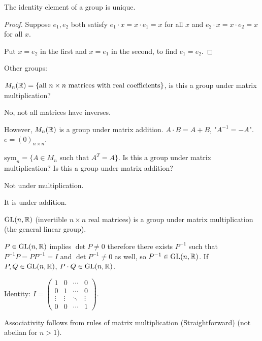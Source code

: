 \documentclass[10pt, a4paper]{article}
\begin{document}
\begin{proposition}
    The identity element of a group is unique.

    \begin{proof}
        Suppose $e_1, e_2$ both satisfy $e_1 \cdot x = x \cdot e_1 = x$ for all $x$ and $e_2 \cdot x = x \cdot e_2 = x$ for all $x$.

        Put $x = e_2$ in the first and $x = e_1$ in the second,
        to find $e_1 = e_2$.
    \end{proof}
\end{proposition}

Other groups:
\begin{example}
    $M_n(\mathbb{R}) = \{\text{all $n \times n$ matrices with real coefficients}\}$,
    is this a group under matrix multiplication?

    \begin{solution}
        No,
        not all matrices have inverses.

        However,
        $M_n(\mathbb{R})$ is a group under matrix addition.
        $A \cdot B = A + B$,
        "$A ^ {-1} = -A$".
        $e = (0)_{n \times n}$.
    \end{solution}
\end{example}

\begin{example}
    $\mathrm{sym}_n = \{A \in M_n \text{ such that } A ^ T = A\}$.
    Is this a group under matrix multiplication?
    Is this a group under matrix addition?

    \begin{solution}
        Not under multiplication.

        It is under addition.
    \end{solution}
\end{example}

\begin{example}
    $\mathrm{GL}(n, \mathbb{R})$
    (invertible $n \times n$ real matrices)
    is a group under matrix multiplication
    (the general linear group).

    \begin{solution}
        $P \in \mathrm{GL}(n, \mathbb{R})$ implies $\det{P} \neq 0$ therefore there exists $P ^ {-1}$ such that $P ^ {-1}P = PP ^ {-1} = I$ and $\det{P ^ {-1}} \neq 0$ as well,
        so $P ^ {-1} \in \mathrm{GL}(n, \mathbb{R})$.
        If $P, Q \in \mathrm{GL}(n, \mathbb{R})$,
        $P \cdot Q \in \mathrm{GL}(n, \mathbb{R})$.

        Identity:
        $I = \begin{pmatrix}
            1 & 0 & \dotsi & 0 \\
            0 & 1 & \dotsi & 0 \\
            \vdots & \vdots & \ddots & \vdots \\
            0 & 0 & \dotsi & 1
        \end{pmatrix}$.

        Associativity follows from rules of matrix multiplication
        (Straightforward)
        (not abelian for $n > 1$).
    \end{solution}
\end{example}
\end{document}
